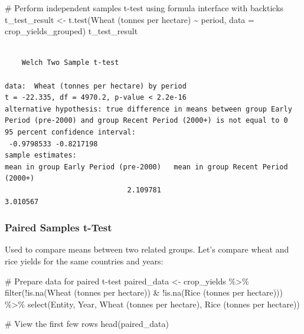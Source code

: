 \documentclass[
  letterpaper,
]{book}
\newenvironment{Shaded}{\begin{snugshade}}{\end{snugshade}}
\newcommand{\AttributeTok}[1]{\textcolor[rgb]{0.40,0.45,0.13}{#1}}
\newcommand{\CommentTok}[1]{\textcolor[rgb]{0.37,0.37,0.37}{#1}}
\newcommand{\FunctionTok}[1]{\textcolor[rgb]{0.28,0.35,0.67}{#1}}
\newcommand{\NormalTok}[1]{\textcolor[rgb]{0.00,0.23,0.31}{#1}}
\newcommand{\OtherTok}[1]{\textcolor[rgb]{0.00,0.23,0.31}{#1}}
\newcommand{\SpecialCharTok}[1]{\textcolor[rgb]{0.37,0.37,0.37}{#1}}
\newcommand{\StringTok}[1]{\textcolor[rgb]{0.13,0.47,0.30}{#1}}
\begin{document}
\begin{Shaded}
\begin{Highlighting}[]
\CommentTok{\# Perform independent samples t{-}test using formula interface with backticks}
\NormalTok{t\_test\_result }\OtherTok{\textless{}{-}} \FunctionTok{t.test}\NormalTok{(}\StringTok{\textasciigrave{}}\AttributeTok{Wheat (tonnes per hectare)}\StringTok{\textasciigrave{}} \SpecialCharTok{\textasciitilde{}}\NormalTok{ period, }\AttributeTok{data =}\NormalTok{ crop\_yields\_grouped)}
\NormalTok{t\_test\_result}
\end{Highlighting}
\end{Shaded}

\begin{verbatim}

    Welch Two Sample t-test

data:  Wheat (tonnes per hectare) by period
t = -22.335, df = 4970.2, p-value < 2.2e-16
alternative hypothesis: true difference in means between group Early Period (pre-2000) and group Recent Period (2000+) is not equal to 0
95 percent confidence interval:
 -0.9798533 -0.8217198
sample estimates:
mean in group Early Period (pre-2000)   mean in group Recent Period (2000+) 
                             2.109781                              3.010567 
\end{verbatim}

\subsubsection{Paired Samples t-Test}\label{paired-samples-t-test-1}

Used to compare means between two related groups. Let's compare wheat
and rice yields for the same countries and years:

\begin{Shaded}
\begin{Highlighting}[]
\CommentTok{\# Prepare data for paired t{-}test}
\NormalTok{paired\_data }\OtherTok{\textless{}{-}}\NormalTok{ crop\_yields }\SpecialCharTok{\%\textgreater{}\%}
  \FunctionTok{filter}\NormalTok{(}\SpecialCharTok{!}\FunctionTok{is.na}\NormalTok{(}\StringTok{\textasciigrave{}}\AttributeTok{Wheat (tonnes per hectare)}\StringTok{\textasciigrave{}}\NormalTok{) }\SpecialCharTok{\&} \SpecialCharTok{!}\FunctionTok{is.na}\NormalTok{(}\StringTok{\textasciigrave{}}\AttributeTok{Rice (tonnes per hectare)}\StringTok{\textasciigrave{}}\NormalTok{)) }\SpecialCharTok{\%\textgreater{}\%}
  \FunctionTok{select}\NormalTok{(Entity, Year, }\StringTok{\textasciigrave{}}\AttributeTok{Wheat (tonnes per hectare)}\StringTok{\textasciigrave{}}\NormalTok{, }\StringTok{\textasciigrave{}}\AttributeTok{Rice (tonnes per hectare)}\StringTok{\textasciigrave{}}\NormalTok{)}

\CommentTok{\# View the first few rows}
\FunctionTok{head}\NormalTok{(paired\_data)}
\end{Highlighting}
\end{Shaded}
\end{document}
